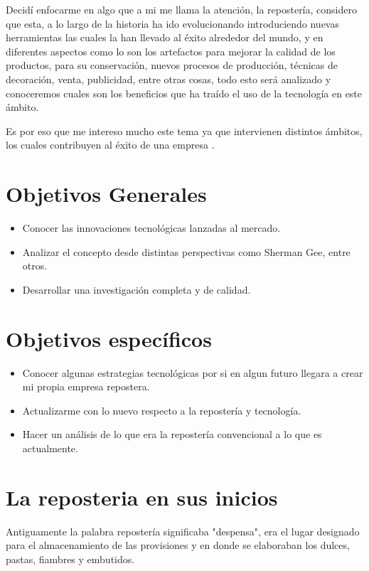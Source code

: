 \documentclass{bmcart}
\begin{document}
Decidí enfocarme en algo que a mi me llama la atención, la repostería, considero que esta, a lo largo de la historia ha ido evolucionando introduciendo nuevas herramientas las cuales la han llevado al éxito alrededor del mundo, y en diferentes aspectos como lo son los artefactos para mejorar la calidad de los productos, para su conservación, nuevos procesos de producción, técnicas de decoración, venta, publicidad, entre otras cosas, todo esto será analizado y conoceremos cuales son los beneficios que ha traído el uso de la tecnología en este ámbito.


Es por eso que me intereso mucho este tema ya que intervienen distintos ámbitos, los cuales contribuyen al éxito de una empresa .


\section{Objetivos Generales}
	\begin{itemize}
\item Conocer las innovaciones tecnológicas lanzadas al mercado.
\item Analizar el concepto desde distintas perspectivas como Sherman Gee, entre otros.
\item Desarrollar una investigación completa y de calidad.

	\end{itemize}
		
\section{Objetivos específicos}
\begin{itemize}
\item Conocer algunas estrategias tecnológicas por si en algun futuro llegara a crear mi propia empresa repostera.
\item Actualizarme con lo nuevo respecto a la repostería y tecnología.
\item Hacer un análisis de lo que era la repostería convencional a lo que es actualmente.

	\end{itemize}

\newpage

\section{La reposteria en sus inicios}
Antiguamente la palabra repostería significaba "despensa", era el lugar designado para el almacenamiento de las provisiones y en donde se elaboraban los dulces, pastas, fiambres y embutidos.
\end{document}
